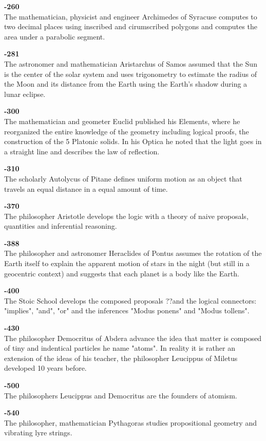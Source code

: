 \textbf{-260}\\
The mathematician, physicist and engineer Archimedes of Syracuse computes to two decimal places using inscribed and cirumscribed polygons and computes the area under a parabolic segment.

\textbf{-281}\\
The astronomer and mathematician Aristarchus of Samos assumed that the Sun is the center of the solar system and uses trigonometry to estimate the radius of the Moon and its distance from the Earth using the Earth's shadow during a lunar eclipse.

\textbf{-300}\\
The mathematician and geometer Euclid published his Elements, where he reorganized the entire knowledge of the geometry including logical proofs, the construction of the 5 Platonic solids. In his Optica he noted that the light goes in a straight line and describes the law of reflection.

\textbf{-310}\\
The scholarly Autolycus of Pitane defines uniform motion as an object that travels an equal distance in a equal amount of time.

\textbf{-370}\\
The philosopher Aristotle develops the logic with a theory of naive proposals, quantities and inferential reasoning.

\textbf{-388}\\
The philosopher and astronomer Heraclides of Pontus assumes the rotation of the Earth itself to explain the apparent motion of stars in the night (but still in a geocentric context) and suggests that each planet is a body like the Earth.

\textbf{-400}\\
The Stoic School develops the composed proposals ??and the logical connectors: "implies", "and", "or" and the inferences "Modus ponens" and "Modus tollens".

\textbf{-430}\\
The philosopher Democritus of Abdera advance the idea that matter is composed of tiny and indentical particles he name "atoms". In reality it is rather an extension of the ideas of his teacher, the philosopher Leucippus of Miletus developed 10 years before.

\textbf{-500}\\
The philosophers Leucippus and Democritus are the founders of atomism.

\textbf{-540}\\
The philosopher, mathematician Pythagoras studies propositional geometry and vibrating lyre strings. 

